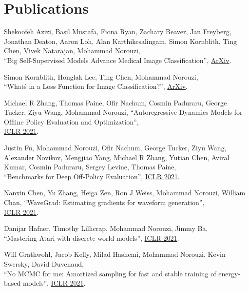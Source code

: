 \documentclass[10pt,letterpaper]{article}
\renewenvironment{itemize}{
  \begin{list}{}{
    \setlength{\leftmargin}{1.5em}
  }
}{
  \end{list}
}
\begin{document}
\section*{Publications}

\begin{itemize}

\item Shekoofeh Azizi, Basil Mustafa, Fiona Ryan, Zachary Beaver, Jan Freyberg, Jonathan Deaton, Aaron Loh, Alan Karthikesalingam, Simon Kornblith, Ting Chen, Vivek Natarajan, Mohammad Norouzi,\\
``Big Self-Supervised Models Advance Medical Image Classification'',
\href{https://arxiv.org/pdf/2101.05224.pdf}{ArXiv}.

\item Simon Kornblith, Honglak Lee, Ting Chen, Mohammad Norouzi,\\
``What\'s in a Loss Function for Image Classification?'',
\href{https://arxiv.org/pdf/2010.16402}{ArXiv}.

\item Michael R Zhang, Thomas Paine, Ofir Nachum, Cosmin Paduraru, George Tucker, Ziyu Wang, Mohammad Norouzi,
``Autoregressive Dynamics Models for Offline Policy Evaluation and Optimization'',\\
\href{https://openreview.net/pdf?id=kmqjgSNXby}{ICLR 2021}.

\item Justin Fu, Mohammad Norouzi, Ofir Nachum, George Tucker, Ziyu Wang, Alexander Novikov, Mengjiao Yang, Michael R Zhang, Yutian Chen, Aviral Kumar, Cosmin Paduraru, Sergey Levine, Thomas Paine,\\
``Benchmarks for Deep Off-Policy Evaluation'',
\href{https://openreview.net/pdf?id=kWSeGEeHvF8}{ICLR 2021}.

\item Nanxin Chen, Yu Zhang, Heiga Zen, Ron J Weiss, Mohammad Norouzi, William Chan,
``WaveGrad: Estimating gradients for waveform generation'',\\
\href{https://openreview.net/pdf?id=NsMLjcFaO8O}{ICLR 2021}.

\item Danijar Hafner, Timothy Lillicrap, Mohammad Norouzi, Jimmy Ba,\\
``Mastering Atari with discrete world models'',
\href{https://openreview.net/pdf?id=0oabwyZbOu}{ICLR 2021}.

\item Will Grathwohl, Jacob Kelly, Milad Hashemi, Mohammad Norouzi, Kevin Swersky, David Duvenaud,\\
``No MCMC for me: Amortized sampling for fast and stable training of energy-based models'',
\href{https://arxiv.org/pdf/2010.04230.pdf}{ICLR 2021}.


\end{itemize}
\end{document}
